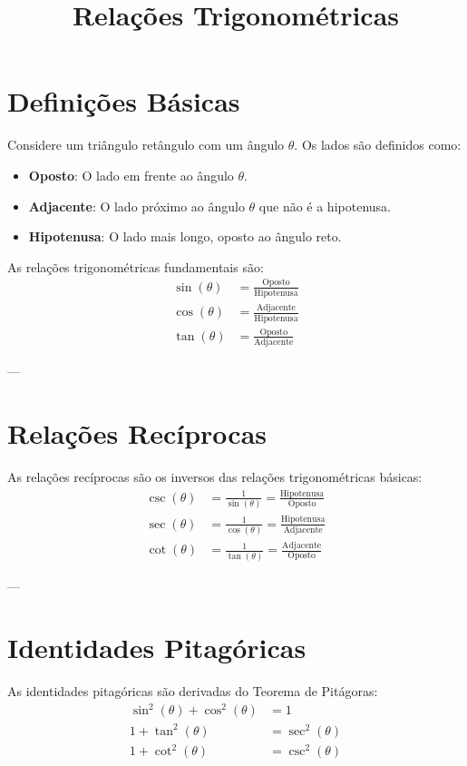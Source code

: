 \documentclass{article}
\title{Relações Trigonométricas}
\author{} %
\date{} %
\begin{document}
\maketitle

\section*{Definições Básicas}
Considere um triângulo retângulo com um ângulo $\theta$. Os lados são definidos como:
\begin{itemize}
    \item \textbf{Oposto}: O lado em frente ao ângulo $\theta$.
    \item \textbf{Adjacente}: O lado próximo ao ângulo $\theta$ que não é a hipotenusa.
    \item \textbf{Hipotenusa}: O lado mais longo, oposto ao ângulo reto.
\end{itemize}

As relações trigonométricas fundamentais são:
\begin{align*}
    \sin(\theta) &= \frac{\text{Oposto}}{\text{Hipotenusa}} \\
    \cos(\theta) &= \frac{\text{Adjacente}}{\text{Hipotenusa}} \\
    \tan(\theta) &= \frac{\text{Oposto}}{\text{Adjacente}}
\end{align*}

---

\section*{Relações Recíprocas}
As relações recíprocas são os inversos das relações trigonométricas básicas:
\begin{align*}
    \csc(\theta) &= \frac{1}{\sin(\theta)} = \frac{\text{Hipotenusa}}{\text{Oposto}} \\
    \sec(\theta) &= \frac{1}{\cos(\theta)} = \frac{\text{Hipotenusa}}{\text{Adjacente}} \\
    \cot(\theta) &= \frac{1}{\tan(\theta)} = \frac{\text{Adjacente}}{\text{Oposto}}
\end{align*}

---

\section*{Identidades Pitagóricas}
As identidades pitagóricas são derivadas do Teorema de Pitágoras:
\begin{align*}
    \sin^2(\theta) + \cos^2(\theta) &= 1 \\
    1 + \tan^2(\theta) &= \sec^2(\theta) \\
    1 + \cot^2(\theta) &= \csc^2(\theta)
\end{align*}
\end{document}
